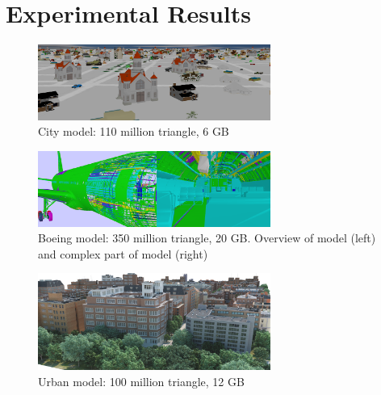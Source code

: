 
\section{Experimental Results}

\begin{figure}[ht]
  \centering
  \includegraphics[width=3.0in]{city.png}
  \caption{City model: 110 million triangle, 6 GB }
  \label{fig:model1}
\end{figure}

\begin{figure}[ht]
  \centering
  \includegraphics[width=3.0in]{BoeingModel.pdf}
  \caption{Boeing model: 350 million triangle, 20 GB. Overview of model (left) and complex part of model (right)}
  \label{fig:model2}
\end{figure}

\begin{figure}[ht]
  \centering
  \includegraphics[width=3.0in]{densecity.jpg}
  \caption{Urban model: 100 million triangle, 12 GB }
  \label{fig:model3}
\end{figure}



